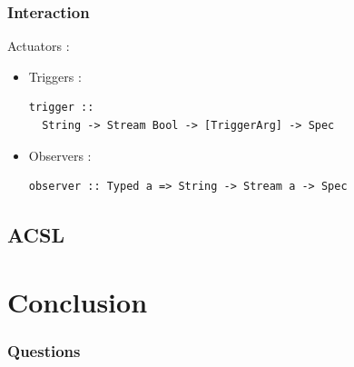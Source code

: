 \documentclass{beamer}
\begin{document}
\begin{frame}[fragile]
  		\frametitle{Interaction}
  		
	Actuators :
  	\begin{itemize}
		\item Triggers : 
\begin{verbatim}
trigger :: 
  String -> Stream Bool -> [TriggerArg] -> Spec
\end{verbatim}
		\item Observers :
\begin{verbatim}
observer :: Typed a => String -> Stream a -> Spec
\end{verbatim}
	\end{itemize}
\end{frame}
  	
  	\subsection{ACSL}
  	\begin{frame}
  		\tableofcontents[currentsubsection,sectionstyle=show/shaded,subsectionstyle=show/shaded/hide]
  	\end{frame}
  	
  	\section{Conclusion}
  	\begin{frame}
  		\frametitle{Questions}
  	\end{frame}
  	
  
\end{document}
